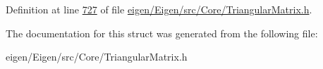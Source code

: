 Definition at line \hyperlink{eigen_2_eigen_2src_2_core_2_triangular_matrix_8h_source_l00727}{727} of file \hyperlink{eigen_2_eigen_2src_2_core_2_triangular_matrix_8h_source}{eigen/\+Eigen/src/\+Core/\+Triangular\+Matrix.\+h}.



The documentation for this struct was generated from the following file\+:\begin{DoxyCompactItemize}
\item 
eigen/\+Eigen/src/\+Core/\+Triangular\+Matrix.\+h\end{DoxyCompactItemize}
